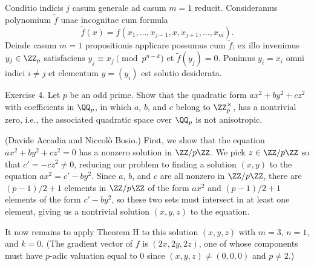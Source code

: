 Conditio indicis $j$ casum generale ad casum $m=1$ reducit.
Consideramus
polynomium $\tilde f$ unae incognitae cum formula
$$\tilde f(x) = f(x_1, \ldots, x_{j-1}, x, x_{j+1}, \ldots, x_m).$$
Deinde casum $m=1$
propositionis applicare possumus cum $\tilde f$;
ex illo invenimus $y_j\in \ZZ_p$ satisfaciens $y_j\equiv x_j\pmod{p^{n-k}}$ et
$\tilde f(y_j) = 0$. Ponimus $y_i = x_i$ omni indici $i\ne j$ et elementum $y = (y_i)$ est
solutio desiderata.\slug

\nineproclaim
Exercise 4. Let $p$ be an odd prime.
Show that the quadratic form $ax^2 + by^2 + cz^2$ with coefficients in $\QQ_p$,
in which $a$, $b$, and $c$ belong to $\ZZ_p^\times$, has a nontrivial zero, i.e., the associated quadratic
space over $\QQ_p$ is not anisotropic.

\nineproof (Davide Accadia and Niccol\`o Bosio.)
First, we show that the equation $ax^2 + by^2 + cz^2 = 0$ has a nonzero solution in $\ZZ/p\ZZ$.
We pick $z\in \ZZ/p\ZZ$ so that $c' = -cz^2 \ne 0$, reducing our problem to finding a solution $(x,y)$
to the equation $ax^2 = c'-by^2$. Since $a$, $b$, and $c$ are all nonzero in $\ZZ/p\ZZ$, there
are $(p-1)/2 + 1$ elements in $\ZZ/p\ZZ$ of the form
$ax^2$ and $(p-1)/2+1$ elements of the form $c'-by^2$, so these two sets must intersect in at least one
element, giving us a nontrivial solution $(x,y,z)$ to the equation.

It now remains to apply Theorem H to this solution $(x,y,z)$ with $m=3$, $n=1$, and $k=0$. (The gradient
vector of $f$ is $(2x,2y,2z)$, one of whose components must have $p$-adic valuation equal to $0$
since $(x,y,z)\ne(0,0,0)$ and $p\ne 2$.)\slug

